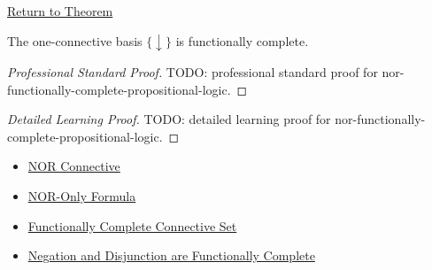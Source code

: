 \newpage
{}
\label{prf:nor-functionally-complete-propositional-logic}

\begin{remark*}[Return]
\hyperref[thm:nor-functionally-complete-propositional-logic]{Return to Theorem}
\end{remark*}

\begin{theorem*}
The one-connective basis \(\{\downarrow\}\) is functionally complete.
\end{theorem*}

\begin{proof}[Professional Standard Proof]
\LRAProofBodyStart
TODO: professional standard proof for nor-functionally-complete-propositional-logic.
\end{proof}

\begin{proof}[Detailed Learning Proof]
\LRAProofBodyStart
TODO: detailed learning proof for nor-functionally-complete-propositional-logic.
\end{proof}

\begin{remark*}
\end{remark*}

\begin{dependencies}
\begin{itemize}
  \item \hyperref[def:nor-connective-propositional-logic]{NOR Connective}
  \item \hyperref[def:nor-only-formula-propositional-logic]{NOR-Only Formula}
  \item \hyperref[def:functionally-complete-connective-set-propositional-logic]{Functionally Complete Connective Set}
  \item \hyperref[thm:negation-disjunction-functionally-complete-propositional-logic]{Negation and Disjunction are Functionally Complete}
\end{itemize}
\end{dependencies}

\clearpage
